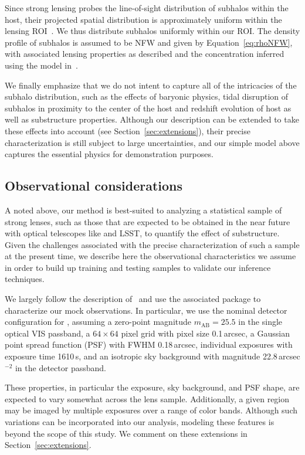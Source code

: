 \documentclass[twocolumn]{aastex63}
\begin{document}
Since strong lensing probes the line-of-sight distribution of subhalos within the host, their projected spatial distribution is approximately uniform within the lensing ROI~\citep{2017MNRAS.469.1997D}. We thus distribute subhalos uniformly within our ROI. The density profile of subhalos is assumed to be NFW and given by Equation~\eqref{eq:rhoNFW}, with associated lensing properties as described and the concentration inferred using the model in~\citet{2014MNRAS.442.2271S}.

We finally emphasize that we do not intent to capture all of the intricacies of the subhalo distribution, such as the effects of baryonic physics, tidal disruption of subhalos in proximity to the center of the host and redshift evolution of host as well as substructure properties. Although our description can be extended to take these effects into account (see Section~\ref{sec:extensions}), their precise characterization is still subject to large uncertainties, and our simple model above captures the essential physics for demonstration purposes.

\subsection{Observational considerations}
\label{sec:observations}

A noted above, our method is best-suited to analyzing a statistical sample of strong lenses, such as those that are expected to be obtained in the near future with optical telescopes like \Euclid and LSST, to quantify the effect of substructure. Given the challenges associated with the precise characterization of such a sample at the present time, we describe here the observational characteristics we assume in order to build up training and testing samples to validate our inference techniques.

We largely follow the description of~\citet{2015ApJ...811...20C} and use the associated  package to characterize our mock observations. In particular, we use the nominal detector configuration for \Euclid, assuming a zero-point magnitude $m_\mathrm{AB} = 25.5$ in the single optical VIS passband, a $64\times64$ pixel grid with pixel size 0.1\,arcsec, a Gaussian point spread function (PSF) with FWHM 0.18\,arcsec, individual exposures with exposure time 1610\,s, and an isotropic sky background with magnitude 22.8\,arcsec$^{-2}$ in the detector passband.

These properties, in particular the exposure, sky background, and PSF shape, are expected to vary somewhat across the lens sample. Additionally, a given region may be imaged by multiple exposures over a range of color bands. Although such variations can be incorporated into our analysis, modeling these features is beyond the scope of this study. We comment on these extensions in Section~\ref{sec:extensions}.
\end{document}
